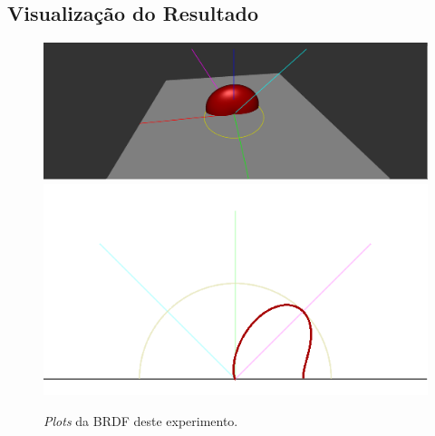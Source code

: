 \subsection{Visualização do Resultado}

\begin{figure}[H]
    \caption{\small{\textit{Plots} da BRDF deste experimento.}}\label{fig-kajiya-plots}
    \vspace{42px}
  \includegraphics[width=\linewidth]{./Imagens/brdfs/aniso-3D-plot}
\endminipage\hfill
{}
  \includegraphics[width=\linewidth]{./Imagens/brdfs/aniso-polar-plot.png}
\endminipage\hfill
\end{figure}

